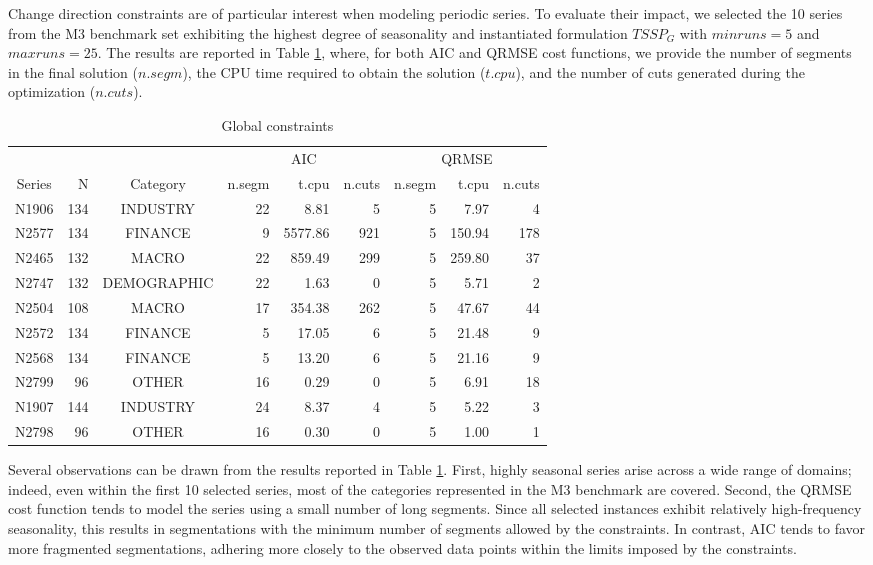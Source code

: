 \documentclass[preprints,article,submit,pdftex,moreauthors]{Definitions/mdpi}
\begin{document}
{	Change direction constraints are of particular interest when modeling periodic series. To evaluate their impact, we selected the 10 series from the M3 benchmark set exhibiting the highest degree of seasonality and instantiated formulation $TSSP_G$ with $minruns = 5$ and $maxruns = 25$. The results are reported in Table \ref{tab:global}, where, for both AIC and QRMSE cost functions, we provide the number of segments in the final solution ($n.segm$), the CPU time required to obtain the solution ($t.cpu$), and the number of cuts generated during the optimization ($n.cuts$).
	
	\begin{table}[ht]
		\centering
		\caption{Global constraints}\label{tab:global}%
		\begin{tabular}{@{}crc|rrr|rrr}
			\toprule
			& & &  \multicolumn{3}{c|}{AIC} & \multicolumn{3}{c}{QRMSE}\\
			Series & N & Category & n.segm & t.cpu & n.cuts & n.segm & t.cpu & n.cuts \\
			\midrule
			N1906 & 134 &    INDUSTRY & 22 &    8.81 &   5 & 5 &   7.97 & 4 \\
			N2577 & 134 &     FINANCE &  9 & 5577.86 & 921 & 5 & 150.94 & 178 \\
			N2465 & 132 &       MACRO & 22 &  859.49 & 299 & 5 & 259.80 & 37 \\
			N2747 & 132 & DEMOGRAPHIC & 22 &    1.63 &   0 & 5 &   5.71 & 2 \\
			N2504 & 108 &       MACRO & 17 &  354.38 & 262 & 5 &  47.67 & 44 \\
			N2572 & 134 &     FINANCE &  5 &   17.05 &   6 & 5 &  21.48 & 9 \\
			N2568 & 134 &     FINANCE &  5 &   13.20 &   6 & 5 &  21.16 & 9 \\
			N2799 &  96 &       OTHER & 16 &    0.29 &   0 & 5 &   6.91 & 18 \\
			N1907 & 144 &    INDUSTRY & 24 &    8.37 &   4 & 5 &   5.22 & 3 \\
			N2798 &  96 &       OTHER & 16 &    0.30 &   0 & 5 &   1.00 & 1 \\
			\bottomrule
		\end{tabular}
	\end{table}
	
	Several observations can be drawn from the results reported in Table \ref{tab:global}. First, highly seasonal series arise across a wide range of domains; indeed, even within the first 10 selected series, most of the categories represented in the M3 benchmark are covered. Second, the QRMSE cost function tends to model the series using a small number of long segments. Since all selected instances exhibit relatively high-frequency seasonality, this results in segmentations with the minimum number of segments allowed by the constraints. In contrast, AIC tends to favor more fragmented segmentations, adhering more closely to the observed data points within the limits imposed by the constraints.
	
}
\end{document}
